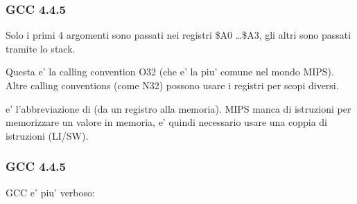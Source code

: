 

\subsubsection{\Optimizing GCC 4.4.5}

Solo i primi 4 argomenti sono passati nei registri \$A0 \dots \$A3, gli altri sono passati tramite lo stack.

Questa e' la calling convention O32 (che e' la piu' comune nel mondo MIPS).
Altre calling conventions (come N32) possono usare i registri per scopi diversi.


 e' l'abbreviazione di  (da un registro alla memoria).
MIPS manca di istruzioni per memorizzare un valore in memoria, e' quindi necessario usare una coppia di istruzioni (LI/SW).





\subsubsection{\NonOptimizing GCC 4.4.5}

\NonOptimizing GCC e' piu' verboso:




